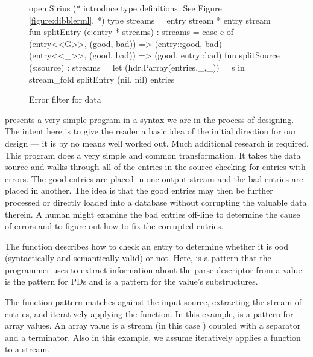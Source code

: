 \documentclass[11pt]{article}
\begin{document}
\begin{figure}
\begin{code}
open Sirius (* introduce \dibbler type definitions. See Figure \ref{figure:dibblerml}. *) 
\mbox{}
type streams = entry stream * entry stream
\mbox{}
fun splitEntry (e:entry * streams) : streams =
  case e of
    (entry<<G>>, (good, bad)) => (entry::good, bad)
  | (entry<<_>>, (good, bad)) => (good, entry::bad)
\mbox{}    
fun splitSource (s:source) : streams =
    let (hdr,Parray(entries,_,_)) = s in 
    stream\_fold splitEntry (nil, nil) entries
\end{code}
\caption{Error filter for \dibbler{} data}
\label{figure:newick-clean}
\end{figure}


 presents a very simple \datatype{}
program in a syntax we are in the process of designing.  The
intent here is to give the reader a basic idea of the initial direction
for our design --- it is by no means well worked out.  Much additional
research is required.  This program does a very simple and common
transformation.  It takes the \dibbler{} data source and
walks through all of the entries in the source checking for
entries with errors.  The good entries are placed in
one output stream and the bad entries are placed in another.
The idea is that the good entries may then be further processed
or directly loaded into a database without corrupting
the valuable data therein.  A human might examine
the bad entries off-line to determine the cause of errors
and to figure out how to fix the corrupted entries.

The  function describes how to check an entry
to determine whether it is ood (syntactically and semantically
valid) or not.  
Here,  is a pattern that the programmer uses
to extract information about the parse descriptor from a value. 
 is the pattern for PDs and  is a pattern for 
the value's substructures.  

The  function pattern matches against the
input source, extracting the stream of entries, and iteratively
applying the  function.  In this example,
 is a pattern for array values.
An array value is a stream (in this case )
coupled with a separator and a terminator.  Also in this example,
we assume  
iteratively applies a function to a stream.  
\end{document}

